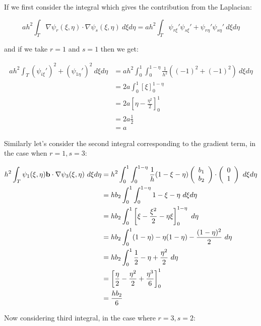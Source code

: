 If we first consider the integral which gives the contribution from the
Laplacian:

\begin{equation*}
    ah^2\int_T\nabla\psi_r(\xi,\eta)\cdot\nabla\psi_s(\xi,\eta)\ d\xi d\eta =
    ah^2\int_T\psi_{r\xi}'\psi_{s\xi}' + \psi_{r\eta}'\psi_{s\eta}'\ d\xi d\eta
\end{equation*}

and if we take $r = 1$ and $s = 1$ then we get:

\begin{align*}
    ah^2\int_T(\psi_{i\xi}')^2 + (\psi_{1\eta}')^2\ d\xi d\eta
    &= ah^2\int_0^1\int_0^{1 - \eta}\frac{1}{h^2}((-1)^2 + (-1)^2)\ d\xi d\eta \\
    &= 2a\int_0^1\left[\xi\right]_0^{1 - \eta} \\
    &= 2a\left[\eta - \frac{\eta^2}{2}\right]_0^1 \\
    &= 2a\frac{1}{2} \\
    &= a
\end{align*}

Similarly let's consider the second integral corresponding to the gradient term,
in the case when $r = 1, s = 3$:

\begin{align*}
    h^2\int_T\psi_1(\xi,\eta)\mathbf{b} \cdot \nabla\psi_3(\xi,\eta)\ d\xi d\eta
     &= h^2\int_0^1\int_0^{1-\eta}\frac{1}{h}(1 - \xi - \eta)
           \left(\begin{array}{c} b_1 \\b_2 \end{array}\right) \cdot
           \left(\begin{array}{c} 0 \\ 1 \end{array}\right)\ d\xi d\eta \\
     &= hb_2\int_0^1\int_0^{1-\eta} 1 - \xi - \eta \ d\xi d\eta \\
     &= hb_2\int_0^1\left[\xi - \frac{\xi^2}{2} - \eta\xi \right]_0^{1-\eta}\ d\eta \\
     &= hb_2\int_0^1(1 -\eta) - \eta(1-\eta) - \frac{(1 - \eta)^2}{2}\ d\eta \\
     &= hb_2\int_0^1\frac{1}{2} -\eta +\frac{\eta^2}{2}\ d\eta \\
     &= \left[\frac{\eta}{2} - \frac{\eta^2}{2} + \frac{\eta^3}{6}\right]_0^1 \\
     &= \frac{hb_2}{6}
\end{align*}

Now considering third integral, in the case where $r = 3, s = 2$:

